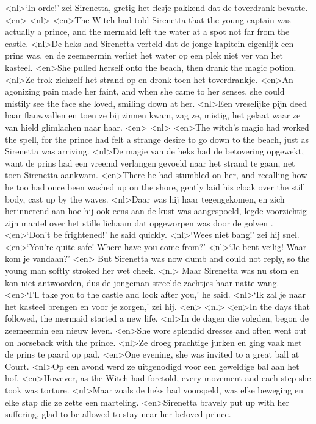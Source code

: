 <nl>`In orde!' zei Sirenetta, gretig het flesje pakkend dat de toverdrank bevatte.
<en>
<nl>
<en>The Witch had told Sirenetta that the young captain was actually a prince, and the mermaid left the water at a spot not far from the castle.
<nl>De heks had Sirenetta verteld dat de jonge kapitein eigenlijk een prins was, en de zeemeermin verliet het water op een plek niet ver van het kasteel.
<en>She pulled herself onto the beach, then drank the magic potion.
<nl>Ze trok zichzelf het strand op en dronk toen het toverdrankje.
<en>An agonizing pain made her faint, and when she came to her senses, she could mistily see the face she loved, smiling down at her.
<nl>Een vreselijke pijn deed haar flauwvallen en toen ze bij zinnen kwam, zag ze, mistig, het gelaat waar ze van hield glimlachen naar haar.
<en>
<nl>
<en>The witch’s magic had worked the spell, for the prince had felt a strange desire to go down to the beach, just as Sirenetta was arriving.
<nl>De magie van de heks had de betovering opgewekt, want de prins had een vreemd verlangen gevoeld naar het strand te gaan, net toen Sirenetta aankwam.
<en>There he had stumbled on her, and recalling how he too had once been washed up on the shore, gently laid his cloak over the still body, cast up by the waves.
<nl>Daar was hij haar tegengekomen, en zich herinnerend aan hoe hij ook eens aan de kust was aangespoeld, legde voorzichtig zijn mantel over het stille lichaam dat  opgeworpen was door de golven .
<en>`Don’t be frightened!' he said quickly.
<nl>`Wees niet bang!' zei hij snel.
<en>`You’re quite safe! Where have you come from?'
<nl>`Je bent veilig! Waar kom je vandaan?'
<en> But Sirenetta was now dumb and could not reply, so the young man softly stroked her wet cheek.
<nl> Maar Sirenetta was nu stom en kon niet antwoorden, dus de jongeman streelde zachtjes haar natte wang.
<en>`I’ll take you to the castle and look after you,' he said.
<nl>`Ik zal je naar het kasteel brengen en voor je zorgen,' zei hij.
<en>
<nl>
<en>In the days that followed, the mermaid started a new life.
<nl>In de dagen die volgden, begon de zeemeermin een nieuw leven.
<en>She wore splendid dresses and often went out on horseback with the prince.
<nl>Ze droeg prachtige jurken en ging vaak met de prins te paard op pad.
<en>One evening, she was invited to a great ball at Court.
<nl>Op een avond werd ze uitgenodigd voor een geweldige bal aan het hof.
<en>However, as the Witch had foretold, every movement and each step she took was torture.
<nl>Maar zoals de heks had voorspeld, was elke beweging en elke stap die ze zette een marteling.
<en>Sirenetta bravely put up with her suffering, glad to be allowed to stay near her beloved prince.
